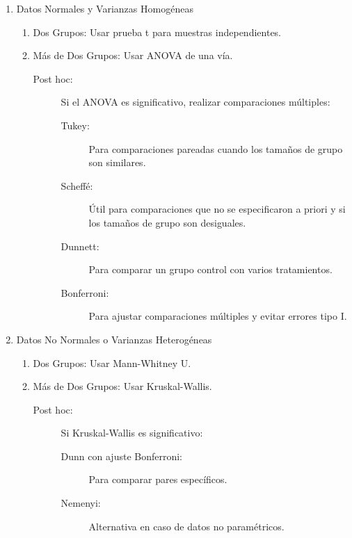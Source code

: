\documentclass[12pt,letterpaper,spanish, twoside]{article}
\begin{document}
\begin{enumerate}
\begin{enumerate}
        \item Datos Normales y Varianzas Homogéneas
        \begin{enumerate}
            \item Dos Grupos: Usar prueba t para muestras independientes.
            \item Más de Dos Grupos: Usar ANOVA de una vía.
                \begin{description}
                    \item[Post hoc:] Si el ANOVA es significativo, realizar comparaciones múltiples:
                        \begin{description}
                            \item[Tukey:] Para comparaciones pareadas cuando los tamaños de grupo son similares.
                            \item[Scheffé:] Útil para comparaciones que no se especificaron a priori y si los tamaños de grupo son desiguales.
                            \item[Dunnett:] Para comparar un grupo control con varios tratamientos.
                            \item[Bonferroni:] Para ajustar comparaciones múltiples y evitar errores tipo I.
                        \end{description}
                \end{description}
        \end{enumerate}

        \item Datos No Normales o Varianzas Heterogéneas
        \begin{enumerate}
            \item Dos Grupos: Usar Mann-Whitney U.
            \item Más de Dos Grupos: Usar Kruskal-Wallis.
                \begin{description}
                    \item[Post hoc:] Si Kruskal-Wallis es significativo:
                        \begin{description}
                            \item[Dunn con ajuste Bonferroni:] Para comparar pares específicos.
                            \item[Nemenyi:] Alternativa en caso de datos no paramétricos.
                        \end{description}
                \end{description}
        \end{enumerate}
    \end{enumerate}


\end{enumerate}
\end{document}
